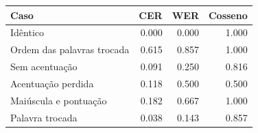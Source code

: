 \begin{tabular}{lrrr}
\hline
Caso & CER & WER & Cosseno \\
\hline
Idêntico & 0.000 & 0.000 & 1.000 \\
Ordem das palavras trocada & 0.615 & 0.857 & 1.000 \\
Sem acentuação & 0.091 & 0.250 & 0.816 \\
Acentuação perdida & 0.118 & 0.500 & 0.500 \\
Maiúscula e pontuação & 0.182 & 0.667 & 1.000 \\
Palavra trocada & 0.038 & 0.143 & 0.857 \\
\hline
\end{tabular}